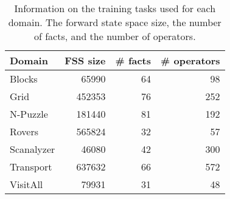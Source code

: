 \begin{table}[tb]
\centering
\caption[Training task summary]{Information on the training tasks used for each domain. The forward state space size, the number of facts, and the number of operators.}
\vspace{\baselineskip}
\begin{tabular}{lrrr}
\toprule
Domain     & FSS size    & \# facts & \# operators \\ \midrule
Blocks     & 65990       & 64       & 98           \\
Grid       & 452353      & 76       & 252          \\
N-Puzzle   & 181440      & 81       & 192          \\
Rovers     & 565824      & 32       & 57           \\
Scanalyzer & 46080       & 42       & 300          \\
Transport  & 637632      & 66       & 572          \\
VisitAll   & 79931       & 31       & 48           \\ \bottomrule
\end{tabular}
\label{tab:tasks_info}
\end{table}
